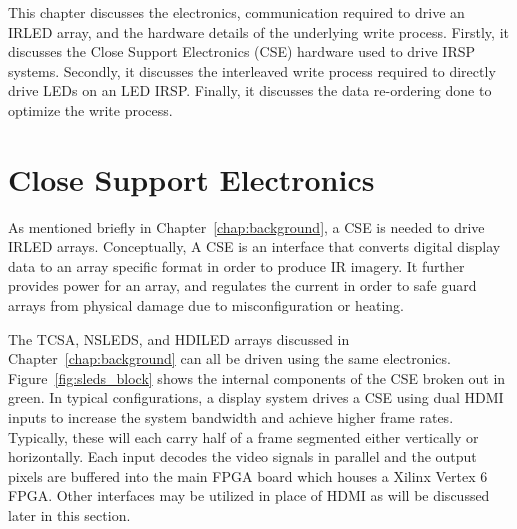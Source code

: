 This chapter discusses the electronics, communication required to drive an IRLED array, and the hardware details of the underlying write process. Firstly, it discusses the Close Support Electronics (CSE) hardware used to drive IRSP systems. Secondly, it discusses the interleaved write process required to directly drive LEDs on an LED IRSP. Finally, it discusses the data re-ordering done to optimize the write process.

\section{Close Support Electronics}
    \label{sec:close_support_electronics}
    As mentioned briefly in Chapter~\ref{chap:background}, a CSE is needed to drive IRLED arrays. Conceptually, A CSE is an interface that converts digital display data to an array specific format in order to produce IR imagery. It further provides power for an array, and regulates the current in order to safe guard arrays from physical damage due to misconfiguration or heating.

    The TCSA, NSLEDS, and HDILED arrays discussed in Chapter~\ref{chap:background} can all be driven using the same electronics. Figure~\ref{fig:sleds_block} shows the internal components of the CSE broken out in green. In typical configurations, a display system drives a CSE using dual HDMI inputs to increase the system bandwidth and achieve higher frame rates. Typically, these will each carry half of a frame segmented either vertically or horizontally. Each input decodes the video signals in parallel and the output pixels are buffered into the main FPGA board which houses a Xilinx Vertex 6 FPGA\cite{XILINX1}. Other interfaces may be utilized in place of HDMI as will be discussed later in this section.

